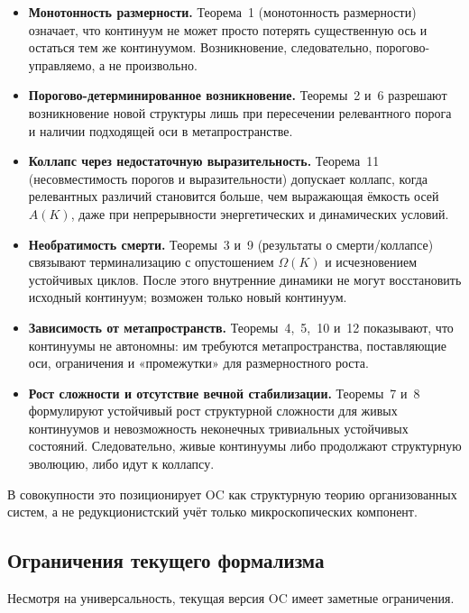 \begin{itemize}
    \item \textbf{Монотонность размерности.}
          Теорема~1 (монотонность размерности) означает, что континуум не может просто
          потерять существенную ось и остаться тем же континуумом.
          Возникновение, следовательно, порогово-управляемо, а не произвольно.
    \item \textbf{Порогово-детерминированное возникновение.}
          Теоремы~2 и~6 разрешают возникновение новой структуры лишь при пересечении
          релевантного порога и наличии подходящей оси в метапространстве.
    \item \textbf{Коллапс через недостаточную выразительность.}
          Теорема~11 (несовместимость порогов и выразительности) допускает коллапс,
          когда релевантных различий становится больше, чем выражающая ёмкость осей
          \(A(K)\), даже при непрерывности энергетических и динамических условий.
    \item \textbf{Необратимость смерти.}
          Теоремы~3 и~9 (результаты о смерти/коллапсе) связывают терминализацию с
          опустошением \(\Omega(K)\) и исчезновением устойчивых циклов. После этого
          внутренние динамики не могут восстановить исходный континуум; возможен только
          новый континуум.
    \item \textbf{Зависимость от метапространств.}
          Теоремы~4,~5,~10 и~12 показывают, что континуумы не автономны: им требуются
          метапространства, поставляющие оси, ограничения и «промежутки» для
          размерностного роста.
    \item \textbf{Рост сложности и отсутствие вечной стабилизации.}
          Теоремы~7 и~8 формулируют устойчивый рост структурной сложности для живых
          континуумов и невозможность неконечных тривиальных устойчивых состояний.
          Следовательно, живые континуумы либо продолжают структурную эволюцию,
          либо идут к коллапсу.
\end{itemize}

В совокупности это позиционирует OC как структурную теорию организованных систем,
а не редукционистский учёт только микроскопических компонент.

\subsection{Ограничения текущего формализма}

Несмотря на универсальность, текущая версия OC имеет заметные ограничения.

